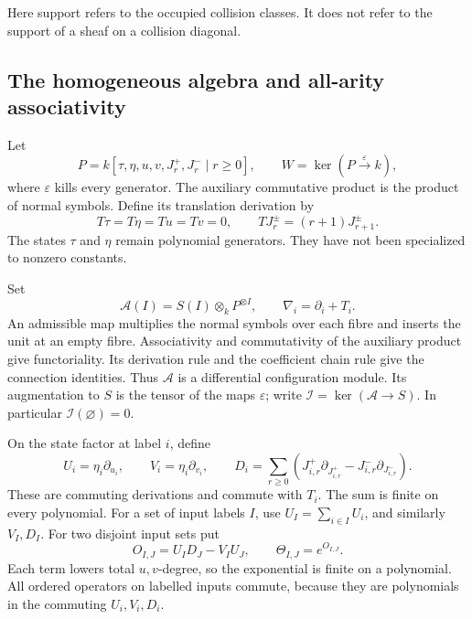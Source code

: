 Here support refers to the occupied collision classes.  It does not
refer to the support of a sheaf on a collision diagonal.

\subsection{The homogeneous algebra and all-arity associativity}

Let
\begin{equation}\label{wo:eq:states}
 P=k[\tau,\eta,u,v,J_r^+,J_r^-\mid r\ge0],
 \qquad W=\ker(P\xrightarrow{\varepsilon}k),
\end{equation}
where \(\varepsilon\) kills every generator.  The auxiliary
commutative product is the product of normal symbols.  Define its
translation derivation by
\[
 T\tau=T\eta=Tu=Tv=0,\qquad
 TJ_r^\pm=(r+1)J_{r+1}^\pm.
\]
The states \(\tau\) and \(\eta\) remain polynomial generators.
They have not been specialized to nonzero constants.

Set
\[
 \mathcal A(I)=S(I)\otimes_k P^{\otimes I},\qquad
 \nabla_i=\partial_i+T_i.
\]
An admissible map multiplies the normal symbols over each fibre and
inserts the unit at an empty fibre.  Associativity and commutativity
of the auxiliary product give functoriality.  Its derivation rule
and the coefficient chain rule give the connection identities.
Thus \(\mathcal A\) is a differential configuration module.
Its augmentation to \(S\) is the tensor of the maps
\(\varepsilon\); write \(\mathcal I=\ker(\mathcal A\to S)\).
In particular \(\mathcal I(\varnothing)=0\).

On the state factor at label \(i\), define
\[
 U_i=\eta_i\partial_{u_i},\qquad
 V_i=\eta_i\partial_{v_i},\qquad
 D_i=\sum_{r\ge0}
 \left(J_{i,r}^+\partial_{J_{i,r}^+}
       -J_{i,r}^-\partial_{J_{i,r}^-}\right).
\]
These are commuting derivations and commute with \(T_i\).
The sum is finite on every polynomial.  For a set of input labels
\(I\), use \(U_I=\sum_{i\in I}U_i\), and similarly \(V_I,D_I\).
For two disjoint input sets put
\begin{equation}\label{wo:eq:ore}
 O_{I,J}=U_I D_J-V_I U_J,\qquad
 \Theta_{I,J}=e^{O_{I,J}}.
\end{equation}
Each term lowers total \(u,v\)-degree, so the exponential is finite
on a polynomial.  All ordered operators on labelled inputs commute,
because they are polynomials in the commuting \(U_i,V_i,D_i\).


